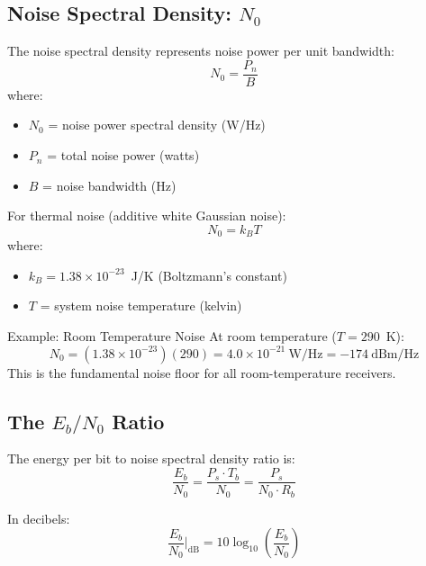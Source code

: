 \subsection{Noise Spectral Density: $N_0$}

The noise spectral density represents noise power per unit bandwidth:
\begin{equation}
N_0 = \frac{P_n}{B}
\end{equation}
where:
\begin{itemize}
\item $N_0$ = noise power spectral density (W/Hz)
\item $P_n$ = total noise power (watts)
\item $B$ = noise bandwidth (Hz)
\end{itemize}

For thermal noise (additive white Gaussian noise):
\begin{equation}
N_0 = k_B T
\end{equation}
where:
\begin{itemize}
\item $k_B = 1.38 \times 10^{-23}$~J/K (Boltzmann's constant)
\item $T$ = system noise temperature (kelvin)
\end{itemize}

\begin{calloutbox}{Example: Room Temperature Noise}
At room temperature ($T = 290$~K):
\begin{equation}
N_0 = (1.38 \times 10^{-23})(290) = 4.0 \times 10^{-21}~\text{W/Hz} = -174~\text{dBm/Hz}
\end{equation}
This is the fundamental noise floor for all room-temperature receivers.
\end{calloutbox}

\subsection{The $E_b/N_0$ Ratio}

The energy per bit to noise spectral density ratio is:
\begin{equation}
\frac{E_b}{N_0} = \frac{P_s \cdot T_b}{N_0} = \frac{P_s}{N_0 \cdot R_b}
\end{equation}

In decibels:
\begin{equation}
\frac{E_b}{N_0}\bigg|_{\text{dB}} = 10\log_{10}\left(\frac{E_b}{N_0}\right)
\end{equation}

